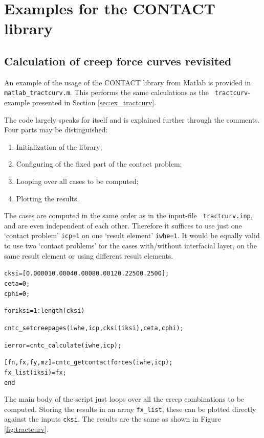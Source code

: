 \documentclass[12pt]{report}
\begin{document}
\section{Examples for the CONTACT library}

\subsection{Calculation of creep force curves revisited}
\label{sec:clib_tract}

An example of the usage of the CONTACT library from Matlab is provided in
{\tt matlab\_\-tract\-curv.m}. This performs the same calculations as the {\tt
tractcurv}-example presented in Section \ref{sec:ex_tractcurv}. 

The code largely speaks for itself and is explained further through the
comments. Four parts may be distinguished:
\begin{enumerate}
\item Initialization of the library;
\item Configuring of the fixed part of the contact problem;
\item Looping over all cases to be computed;
\item Plotting the results.
\end{enumerate} 
The cases are computed in the same order as in the input-file {\tt
tractcurv.inp}, and are even independent of each other. Therefore it
suffices to use just one `contact problem' {\tt icp=1} on one
`result element' {\tt iwhe=1}. It would be equally valid to use two
`contact problems' for the cases with/without interfacial layer, on
the same result element or using different result elements.
\begin{alltt}\small

cksi = [ 0.00001 0.0004 0.0008 0.0012     0.2250 0.2500 ];  %
ceta = 0; %
cphi = 0; %

for iksi = 1:length(cksi)

   cntc_setcreepages(iwhe, icp, cksi(iksi), ceta, cphi);

   ierror = cntc_calculate(iwhe, icp);

   [fn, fx, fy, mz] = cntc_getcontactforces(iwhe, icp);
   fx_list(iksi) = fx;
end
\end{alltt}
The main body of the script just loops over all the creep combinations to
be computed. Storing the results in an array {\tt fx\_list}, these can be
plotted directly against the inputs {\tt cksi}. 
The results are the same as shown in Figure \ref{fig:tractcurv}.
\end{document}
